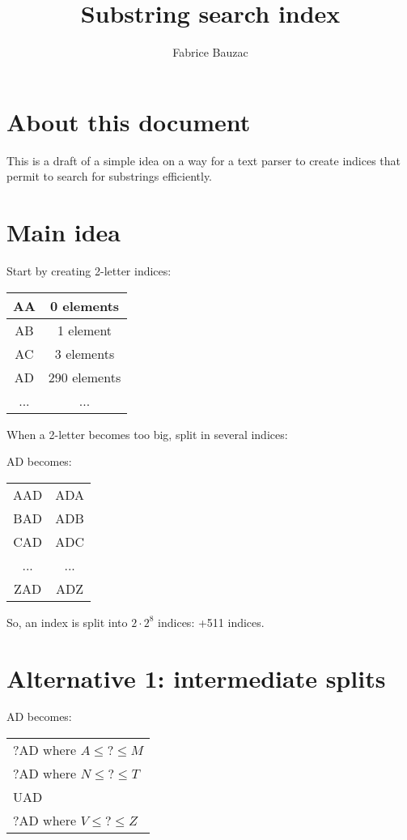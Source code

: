 \documentclass{article}
\title{Substring search index}
\author{Fabrice {\sc Bauzac}}
\begin{document}
\maketitle

\section{About this document}

This is a draft of a simple idea on a way for a text parser to create
indices that permit to search for substrings efficiently.

\section{Main idea}

Start by creating 2-letter indices:

\begin{center}
\begin{tabular}{c|c}
AA & 0 elements \\
\hline
AB & 1 element \\
\hline
AC & 3 elements \\
\hline
AD & 290 elements \\
\hline
... & ... \\
\end{tabular}
\end{center}

When a 2-letter becomes too big, split in several indices:

AD becomes:

\begin{center}
\begin{tabular}{c|c}
AAD & ADA \\
BAD & ADB \\
CAD & ADC \\
... & ... \\
ZAD & ADZ \\
\end{tabular}
\end{center}

So, an index is split into $2 \cdot{} 2^8$ indices: +511 indices.

\section{Alternative 1: intermediate splits}

AD becomes:

\begin{center}
\begin{tabular}{l}
?AD where $A \le{} ? \le{} M$ \\
?AD where $N \le{} ? \le{} T$ \\
UAD \\
?AD where $V \le{} ? \le{} Z$ \\
\end{tabular}
\end{center}
\end{document}
